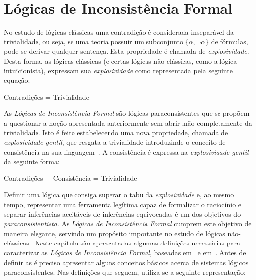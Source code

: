 \chapter{Lógicas de Inconsistência Formal}
\label{cap:LFIs}
No estudo de lógicas clássicas uma contradição é considerada inseparável da trivialidade, ou seja, se uma teoria possuir um subconjunto $\{\alpha,\neg \alpha\}$ de fórmulas, pode-se derivar qualquer sentença. Esta propriedade é chamada de \textit{explosividade}. Desta forma, as lógicas clássicas (e certas lógicas não-clássicas, como a lógica intuicionista), expressam sua \textit{explosividade} como representada pela seguinte equação:
\begin{center}
    Contradições = Trivialidade
\end{center}
As \textit{Lógicas de Inconsistência Formal} são lógicas paraconsistentes que se propõem a questionar a noção apresentada anteriormente sem abrir mão completamente da trivialidade. Isto é feito estabelecendo uma nova propriedade, chamada de \textit{explosividade gentil}, que resgata a trivialidade introduzindo o conceito de consistência na sua linguagem~\cite{carnielli2007}. A consistência é expressa na \textit{explosividade gentil} da seguinte forma:
\begin{center}
    Contradições + Consistência = Trivialidade
\end{center}
Definir uma lógica que consiga superar o tabu da \textit{explosividade} e, ao mesmo tempo, representar uma ferramenta legítima capaz de formalizar o raciocínio e separar inferências aceitáveis de inferências equivocadas é um dos objetivos do \textit{paraconsistentista}. As \textit{Lógicas de Inconsistência Formal} cumprem este objetivo de maneira elegante, servindo um propósito importante no estudo de lógicas não-clássicas..
Neste capítulo são apresentadas algumas definições necessárias para caracterizar as \textit{Lógicas de Inconsistência Formal}, baseadas em~ e em~. Antes de definir as \lfis{} é preciso apresentar alguns conceitos básicos acerca de sistemas lógicos paraconsistentes. Nas definições que seguem, utiliza-se a seguinte representação:
